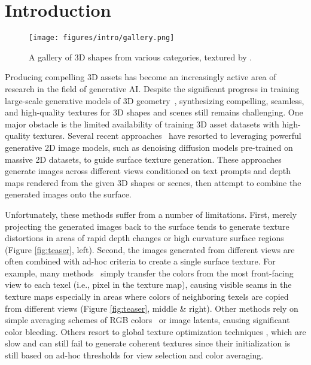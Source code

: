 \section{Introduction}
\label{sec:intro} 

\begin{figure*}[!t]
    \texttt{[image: figures/intro/gallery.png]}
    \vspace*{-7mm}
    \caption{A gallery of 3D shapes from various categories, textured by \method.}
    \label{fig:gallery}
    \vspace*{-5mm}
\end{figure*}

Producing compelling 3D assets has become an increasingly active area of research in the field of generative AI. 
Despite the significant progress in training large-scale generative models of 3D geometry~\cite{Lin:2023:Magic3D, 
Liu:2023:Zero, Wang:2024:Prolificdreamer, Gao:2022:Get3d, Jun:2023:Shape, Νichol:2022:Pointe, Vahdat:2022:Lion, 
Liu:2024:One, Liu:2023:One2345plus, Shi:2023:Zero123plus, Zhang:2024:CLAY}, synthesizing compelling, seamless, and 
high-quality textures for 3D shapes and scenes still remains challenging. One major obstacle is the limited 
availability of training 3D asset datasets with high-quality textures. Several recent 
approaches~\cite{Chen:2023:Text2tex, Richardson:2023:Texture, 
Cao:2023:Texfusion, Ceylan:2024:Matatlas, Zeng:2024:Paint3D, Liu:2024:SyncMVD, Cheng:2024:MVPaint}  have resorted 
to leveraging powerful generative 2D image models, such as denoising diffusion models pre-trained on massive 2D 
datasets, to guide surface texture generation. These approaches generate images across different views conditioned 
on text prompts and depth maps rendered from the given 3D shapes or scenes, then attempt to combine the generated 
images onto the surface.

Unfortunately, these methods suffer from a number of limitations. First, merely projecting the generated images 
back to the surface tends to generate texture distortions in areas of rapid depth changes or high curvature
surface regions (Figure \ref{fig:teaser}, left). Second, the images generated from different views are often combined 
with ad-hoc criteria to create a single surface texture. For example, many methods~\cite{Chen:2023:Text2tex, Richardson:2023:Texture}
simply transfer the colors from the most front-facing view to each texel (i.e., pixel in the texture map), causing 
visible seams in the texture maps especially in areas where colors of neighboring texels are copied from different 
views (Figure \ref{fig:teaser}, middle \& right). Other methods rely on simple averaging schemes of RGB 
colors~\cite{Ceylan:2024:Matatlas} or image latents, causing significant color bleeding. 
Others resort to global texture optimization techniques
\cite{Cao:2023:Texfusion, Liu:2024:SyncMVD}, which are slow and can still fail to generate 
coherent textures since their initialization is still based on ad-hoc thresholds for view 
selection and color averaging. 

